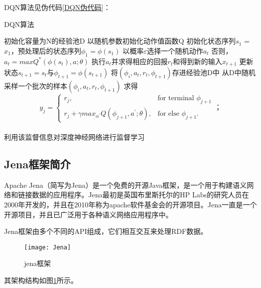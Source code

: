 DQN算法见伪代码\ref{DQN伪代码}：
\begin{algorithm}
    \caption{DQN算法}
    \label{DQN伪代码}    
    初始化容量为N的经验池D\;
    以随机参数初始化动作值函数Q\;
    {
        初始化状态序列$s_1$ = {$x_1$}，预处理后的状态序列$\phi_1 = \phi(s_1) $\;
        {
            以概率$\varepsilon$选择一个随机动作$a_t$\;
            否则，$a_t = maxQ^*(\phi(s_t),a;\theta)$\;
            执行$a_t$并求得相应的回报$r_t$和得到新的输入$x_{t+1}$\;
            更新状态$s_{t+1}=s_t$与$\phi_{t+1} = \phi(s_{t+1})$\;
            将$(\phi_i,a_t,r_t,\phi_{t+1})$存进经验池D中\;
            从D中随机采样一个批次的样本$(\phi_i,a_t,r_t,\phi_{t+1})$\;
            求得
            \[
                y_j = \begin{cases}
                    r_j,& \text{for terminal }\phi_{j+1}\\
                    r_j+\gamma max_{\alpha^{'}}Q(\phi_{j+1},a^{'};\theta), & \text{for else } \phi_{j+1}.
                \end{cases}；
            \]\\
            利用该监督信息对深度神经网络进行监督学习\;
        }            
    }
\end{algorithm} 

\subsection{Jena框架简介}
Apache Jena（简写为Jena）是一个免费的开源Java框架，是一个用于构建语义网络和链接数据的应用程序。Jena最初是英国布里斯托尔的HP Labs的研究人员在2000年开发的，并且在2010年称为apache软件基金会的开源项目。Jena一直是一个开源项目，并且已广泛用于各种语义网络应用程序中。

Jena框架由多个不同的API组成，它们相互交互来处理RDF数据。
\begin{figure}[h]
    \centering
    \texttt{[image: Jena]}
    \caption{jena框架}
    \label{Jena}
\end{figure}
其架构结构如图\ref{Jena}所示。

